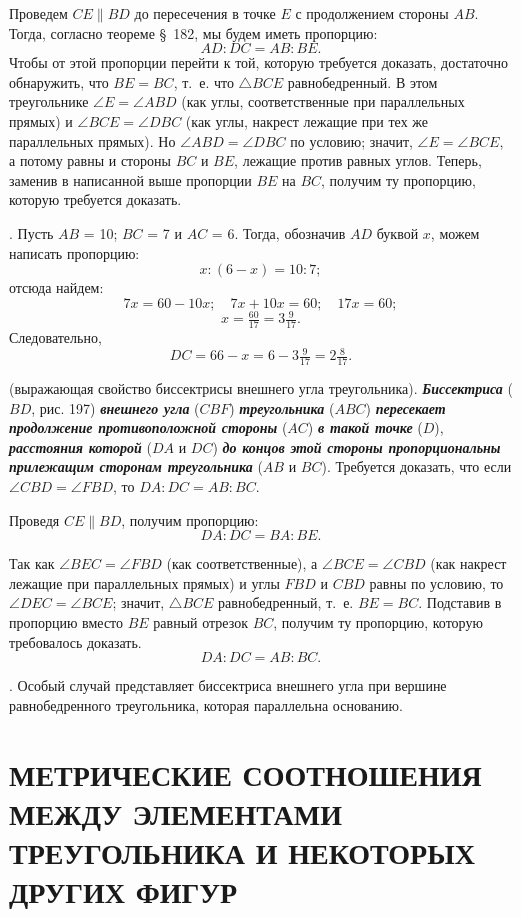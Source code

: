 \documentclass[oneside]{book}
\begin{document}
Проведем $CE \parallel BD$ до пересечения в точке $E$ с продолжением стороны $AB$.
Тогда, согласно теореме §~182, мы будем иметь пропорцию:
\[AD:DC=AB:BE.\]
Чтобы от этой пропорции перейти к той, которую требуется доказать, достаточно обнаружить, что $BE=BC$, т.~е. что $\triangle BCE$ равнобедренный.
В этом треугольнике $\angle E=\angle ABD$ (как углы, соответственные при параллельных прямых) и $\angle BCE = \angle DBC$ (как углы, накрест лежащие при тех же параллельных прямых).
Но $\angle ABD=\angle DBC$ по условию;
значит, $\angle E = \angle BCE$, а потому равны и стороны $BC$ и $BE$, лежащие против равных углов.
Теперь, заменив в написанной выше пропорции $BE$ на $BC$, получим ту пропорцию, которую требуется доказать.

.
Пусть $AB$ = 10;
$BC$ = 7 и $AC$ = 6.
Тогда, обозначив $AD$ буквой $x$, можем написать пропорцию:
\[x : (6 - x) = 10 : 7;\]
отсюда найдем:
\[7x=60-10x;
\quad
7x+10x=60;
\quad
17x=60;
\]
\[x=\tfrac{60}{17}=3\tfrac9{17}.\]
Следовательно,
\[DC=66-x=6-3\tfrac9{17}=2\tfrac8{17}.\]

 (выражающая свойство биссектрисы внешнего угла треугольника).
\textbf{\emph{Биссектриса}} ($BD$, рис. 197) \textbf{\emph{внешнего угла}} ($CBF$) \textbf{\emph{треугольника}} ($ABC$) \textbf{\emph{пересекает продолжение противоположной стороны}} ($AC$) \textbf{\emph{в такой точке}} ($D$), \textbf{\emph{расстояния которой}} ($DA$ и $DC$) \textbf{\emph{до концов этой стороны пропорциональны прилежащим сторонам треугольника}} ($AB$ и $BC$).
Требуется доказать, что если $\angle CBD=\angle FBD$, то $DA:DC=AB:BC$.

Проведя $CE \parallel BD$, получим пропорцию:
\[DA:DC=BA:BE.\]

Так как $\angle BEC=\angle FBD$ (как соответственные), а $\angle BCE=\angle CBD$ (как накрест лежащие при параллельных прямых) и углы $FBD$ и $CBD$ равны по условию, то $\angle DEC=\angle BCE$;
значит, $\triangle BCE$ равнобедренный, т.~е. $BE=BC$.
Подставив в пропорцию вместо $BE$ равный отрезок $BC$, получим ту пропорцию, которую требовалось доказать.
\[DA:DC=AB:BC.\]

.
Особый случай представляет биссектриса внешнего угла при вершине равнобедренного треугольника, которая параллельна основанию.

\section{МЕТРИЧЕСКИЕ СООТНОШЕНИЯ
МЕЖДУ ЭЛЕМЕНТАМИ ТРЕУГОЛЬНИКА
И НЕКОТОРЫХ ДРУГИХ ФИГУР}
\end{document}
